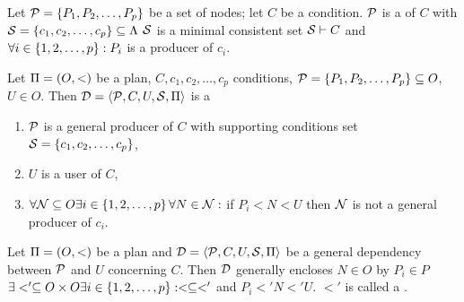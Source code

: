 \begin{defi}
Let $\mathcal{P}=\left\{ P_1,P_2,\ldots,P_p\right\}$ be a set of nodes; let $C$ be a condition. $\mathcal{P}$ is a  of $C$ with  $\mathcal{S}=\left\{ c_1,c_2,\ldots,c_p\right\}\subseteq\Lambda$ \iffTx{} $\mathcal{S}$ is a minimal consistent set \stTx{} $\mathcal{S}\vdash C$ and $\forall i\in\left\{ 1,2,\ldots,p\right\}:P_i$ is a producer of $c_i$.
\cite{conf/ijcai/HertzbergH89}
\end{defi}

\begin{defi}
Let $\Pi=\left( O,<\right)$ be a plan, $C,c_1,c_2,\ldots,c_p$ conditions, $\mathcal{P}=\left\{ P_1,P_2,\ldots,P_p\right\}\subseteq O$, $U\in O$. Then $\mathcal{D}=\left\langle \mathcal{P},C,U,\mathcal{S},\Pi\right\rangle$ is a  \iffTx{}
\begin{enumerate}
 \item $\mathcal{P}$ is a general producer of $C$ with supporting conditions set $\mathcal{S}=\left\{ c_1,c_2,\ldots,c_p\right\}$,
 \item $U$ is a user of $C$,
 \item $\forall\mathcal{N}\subseteq O\exists i\in\left\{ 1,2,\ldots,p\right\}\forall N\in\mathcal{N}:$ if $P_i<N<U$ then $\mathcal{N}$ is not a general producer of $c_i$.
\end{enumerate}
\cite{conf/ijcai/HertzbergH89}
\end{defi}

\begin{defi}
Let $\Pi=\left( O,<\right)$ be a plan and $\mathcal{D}=\left\langle \mathcal{P},C,U,\mathcal{S},\Pi\right\rangle$ be a general dependency between $\mathcal{P}$ and $U$ concerning $C$. Then $\mathcal{D}$ generally encloses $N\in O$ by $P_i\in P$ \iffTx{} $\exists <'\subseteq O\times O\exists i\in\left\{ 1,2,\ldots,p\right\}:<\subseteq<'$ and $P_i<'N<'U$. $<'$ is called a .
\cite{conf/ijcai/HertzbergH89}
\end{defi}

